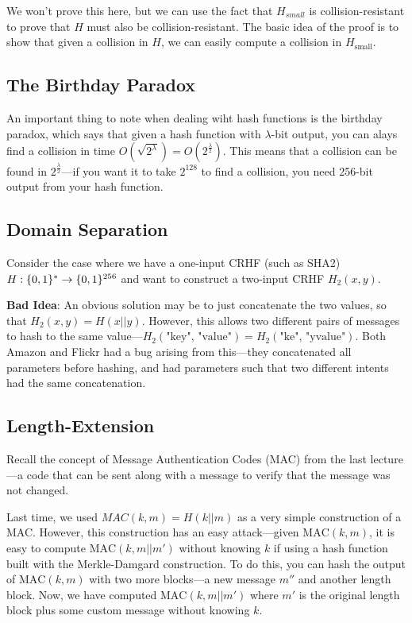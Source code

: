 We won't prove this here, but we can use the fact that $H_{small}$ is collision-resistant to prove that $H$ must also be collision-resistant. The basic idea of the proof is to show that given a collision in $H$, we can easily compute a collision in $H_{\text{small}}$. 

\subsection{The Birthday Paradox}
An important thing to note when dealing wiht hash functions is the birthday paradox, which says that given a hash function with $\lambda$-bit output, you can alays find a collision in time $O(\sqrt{2^\lambda}) = O(2^{\frac{\lambda}{2}})$. This means that a collision can be found in $2^\frac{\lambda}{2}$---if you want it to take $2^{128}$ to find a collision, you need 256-bit output from your hash function.

\subsection{Domain Separation}
Consider the case where we have a one-input CRHF (such as SHA2) $H: \{0,1\}^* \rightarrow \{0,1\}^{256}$ and want to construct a two-input CRHF $H_2(x, y)$. 

\textbf{Bad Idea}: An obvious solution may be to just concatenate the two values, so that $H_2(x, y) = H(x || y)$. However, this allows two different pairs of messages to hash to the same value---$H_2(\text{"key", "value"}) = H_2(\text{"ke", "yvalue"})$. Both Amazon and Flickr had a bug arising from this---they concatenated all parameters before hashing, and had parameters such that two different intents had the same concatenation.

\subsection{Length-Extension}
Recall the concept of Message Authentication Codes (MAC) from the last lecture---a code that can be sent along with a message to verify that the message was not changed.

Last time, we used $MAC(k, m) = H(k || m)$ as a very simple construction of a MAC. However, this construction has an easy attack---given $\text{MAC}(k, m)$, it is easy to compute $\text{MAC}(k, m||m')$ without knowing $k$ if using a hash function built with the Merkle-Damgard construction. To do this, you can hash the output of $\text{MAC}(k, m)$ with two more blocks---a new message $m''$ and another length block. Now, we have computed $\text{MAC}(k, m||m')$ where $m'$ is the original length block plus some custom message without knowing $k$. 

